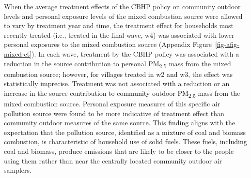 \documentclass[
  letterpaper,
  DIV=11,
  numbers=noendperiod]{scrartcl}
\makeatletter
\renewenvironment{table}%
   {\renewcommand\familydefault\sfdefault
    \@float{table}}
   {\end@float}
\providecommand{\DIFaddendFL}{} %
\DeclareRobustCommand{\DIFaddendFL}{\DIFOaddendFL \let\includegraphics\DIFOincludegraphics} %
\makeatother
\begin{document}
\begin{table}

\DIFaddendFL \end{table}%

When the average treatment effects of the CBHP policy on community
outdoor levels and personal exposure levels of the mixed combustion
source were allowed to vary by treatment year and time, the treatment
effect for households most recently treated (i.e., treated in the final
wave, w4) was associated with lower personal exposures to the mixed
combustion source (Appendix Figure~\ref{fig-afig-mixed-ct}). In each
wave, treatment by the CBHP policy was associated with a reduction in
the source contribution to personal PM\textsubscript{2.5} mass from the
mixed combustion source; however, for villages treated in w2 and w3, the
effect was statistically imprecise. Treatment was not associated with a
reduction or an increase in the source contribution to community outdoor
PM\textsubscript{2.5} mass from the mixed combustion source. Personal
exposure measures of this specific air pollution source were found to be
more indicative of treatment effect than community outdoor measures of
the same source. This finding aligns with the expectation that the
pollution source, identified as a mixture of coal and biomass
combustion, is characteristic of household use of solid fuels. These
fuels, including coal and biomass, produce emissions that are likely to
be closer to the people using them rather than near the centrally
located community outdoor air samplers.
\end{document}
